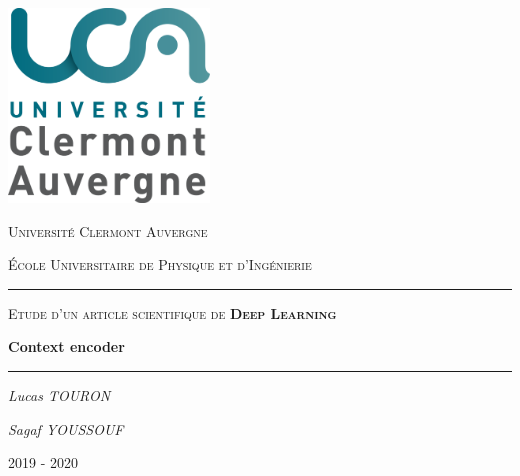 \documentclass[11pt,a4paper]{article}
\begin{document}
    \begin{titlepage}
        \centering
        \includegraphics[width=0.40\textwidth]{uca.png}\par\vspace{1cm}
        {\scshape\LARGE Université Clermont Auvergne \par}
        {\scshape École Universitaire de Physique et d'Ingénierie \par}
        \vspace{2cm}
        \noindent\rule{\textwidth}{0.5pt}\par
        {\scshape\Large Etude d'un article scientifique de \textbf{Deep Learning}\par}
        \vspace{0.5cm}
        {\huge\bfseries Context encoder\par}
        \noindent\rule{\textwidth}{0.5pt}\par
        \vspace{5cm}
        {\Large\itshape Lucas TOURON\par}
        {\Large\itshape Sagaf YOUSSOUF\par}

        \vfill

        {\large 2019 - 2020\par}
    \end{titlepage}



    \tableofcontents
    \newpage
    
    
    
\end{document}

